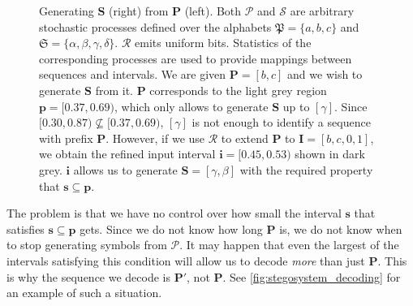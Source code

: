 \documentclass[draft]{IIBproject}
\makeatletter
\DeclareRobustCommand*{\AbbreviationWithDot}[1]{\@ifnextchar{.}{#1}{#1.\@\xspace}}
\DeclareRobustCommand*{\iid}{\AbbreviationWithDot{i.i.d}}
\makeatother
\begin{document}
\begin{figure}[h!]
	\caption{\label{fig:stegosystem_encoding}Generating $\mathbf S$ (right) from $\mathbf P$ (left). Both $\mathcal P$ and $\mathcal S$ are arbitrary stochastic processes defined over the alphabets $\mathfrak P = \{a,b,c\}$ and $\mathfrak S = \{\alpha,\beta,\gamma,\delta\}$. $\mathcal R$ emits \iid uniform bits. Statistics of the corresponding processes are used to provide mappings between sequences and intervals. We are given $\mathbf P = [b,c]$ and we wish to generate $\mathbf S$ from it. $\mathbf P$ corresponds to the light grey region $\mathbf p = [0.37,0.69)$, which only allows to generate $\mathbf S$ up to $[\gamma]$. Since $[0.30,0.87) \nsubseteq [0.37,0.69)$, $[\gamma]$ is not enough to identify a sequence with prefix $\mathbf P$. However, if we use $\mathcal R$ to extend $\mathbf P$ to $\mathbf I = [b,c,0,1]$, we obtain the refined input interval $\mathbf i = [0.45, 0.53)$ shown in dark grey. $\mathbf i$ allows us to generate $\mathbf S = [\gamma,\beta]$ with the required property that $\mathbf s \subseteq \mathbf p$.}

\end{figure}

The problem is that we have no control over how small the interval $\mathbf s$ that satisfies $\mathbf s \subseteq \mathbf p$ gets. Since we do not know how long $\mathbf P$ is, we do not know when to stop generating symbols from $\mathcal P$. It may happen that even the largest of the intervals satisfying this condition will allow us to decode \emph{more} than just $\mathbf P$. This is why the sequence we decode is $\mathbf{P'}$, not $\mathbf P$. See \cref{fig:stegosystem_decoding} for an example of such a situation.
\end{document}

